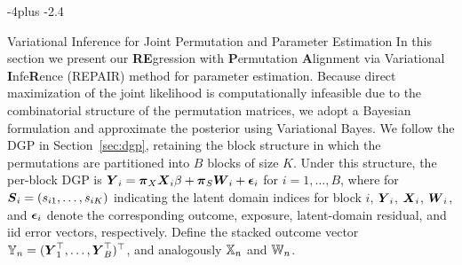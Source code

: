 \documentclass[numsec,webpdf,modern,medium,namedate]{oup-authoring-template}
\makeatletter
\theoremstyle{thmstyleone}%
\theoremstyle{thmstyletwo}%
\theoremstyle{thmstylethree}%
\def\section{%
  \@startsection{section}{1}{\z@}
  {-4\p@ plus -2\p@}{\if@traditional\if@large.4\p@\else\if@medium6.5\p@\else4\p@\fi\fi\else\if@contemporary5\p@\else4\p@\fi\fi}
  {\reset@font\raggedright\secsize}}
\makeatother
\begin{document}
\section{Variational Inference for Joint Permutation and Parameter Estimation}\label{sec:vb}
In this section we present our \textbf{RE}gression with \textbf{P}ermutation \textbf{A}lignment via Variational \textbf{I}nfe\textbf{R}ence (REPAIR) method for parameter estimation. Because direct maximization of the joint likelihood is computationally infeasible due to the combinatorial structure of the permutation matrices, we adopt a Bayesian formulation and approximate the posterior using Variational Bayes. We follow the DGP in Section~\ref{sec:dgp}, retaining the block structure in which the permutations are partitioned into $B$ blocks of size $K$. Under this structure, the per-block DGP is $\boldsymbol{Y}_i=\boldsymbol{\pi}_X \boldsymbol{X}_i \beta + \boldsymbol{\pi}_S \boldsymbol{W}_i + \boldsymbol{\epsilon}_i$ for $i=1,\ldots,B$, where for $\boldsymbol{S}_i=(s_{i1},\ldots,s_{iK})$ indicating the latent domain indices for block $i$, $\boldsymbol{Y}_i$, $\boldsymbol{X}_i$, $\boldsymbol{W}_i$, and $\boldsymbol{\epsilon}_i$ denote the corresponding outcome, exposure, latent-domain residual, and iid error vectors, respectively. Define the stacked outcome vector $\mathbb{Y}_n=(\boldsymbol{Y}_1^\top,\ldots,\boldsymbol{Y}_B^\top)^\top$, and analogously $\mathbb{X}_n$ and $\mathbb{W}_n$.
\end{document}

